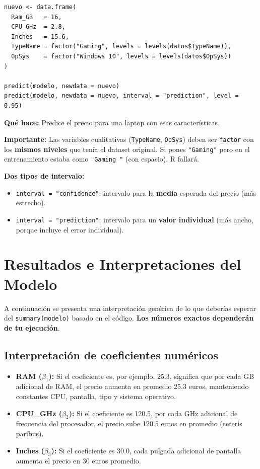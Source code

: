 \documentclass[12pt,a4paper]{article}
\begin{document}
\begin{lstlisting}[caption={Predicción para un nuevo equipo}]
nuevo <- data.frame(
  Ram_GB   = 16,
  CPU_GHz  = 2.8,
  Inches   = 15.6,
  TypeName = factor("Gaming", levels = levels(datos$TypeName)),
  OpSys    = factor("Windows 10", levels = levels(datos$OpSys))
)

predict(modelo, newdata = nuevo)
predict(modelo, newdata = nuevo, interval = "prediction", level = 0.95)
\end{lstlisting}

\textbf{Qué hace:} Predice el precio para una laptop con esas características.

\textbf{Importante:} Las variables cualitativas (\texttt{TypeName}, \texttt{OpSys}) deben ser \texttt{factor} con los \textbf{mismos niveles} que tenía el dataset original. Si pones \texttt{"Gaming"} pero en el entrenamiento estaba como \texttt{"Gaming "} (con espacio), R fallará.

\textbf{Dos tipos de intervalo:}
\begin{itemize}
    \item \texttt{interval = "confidence"}: intervalo para la \textbf{media} esperada del precio (más estrecho).
    \item \texttt{interval = "prediction"}: intervalo para un \textbf{valor individual} (más ancho, porque incluye el error individual).
\end{itemize}

\section{Resultados e Interpretaciones del Modelo}

A continuación se presenta una interpretación genérica de lo que deberías esperar del \texttt{summary(modelo)} basado en el código. \textbf{Los números exactos dependerán de tu ejecución}.

\subsection{Interpretación de coeficientes numéricos}

\begin{itemize}
    \item \textbf{RAM ($\beta_1$):} Si el coeficiente es, por ejemplo, 25.3, significa que por cada GB adicional de RAM, el precio aumenta en promedio 25.3 euros, manteniendo constantes CPU, pantalla, tipo y sistema operativo.
    
    \item \textbf{CPU\_GHz ($\beta_2$):} Si el coeficiente es 120.5, por cada GHz adicional de frecuencia del procesador, el precio sube 120.5 euros en promedio (ceteris paribus).
    
    \item \textbf{Inches ($\beta_3$):} Si el coeficiente es 30.0, cada pulgada adicional de pantalla aumenta el precio en 30 euros promedio.
\end{itemize}
\end{document}
